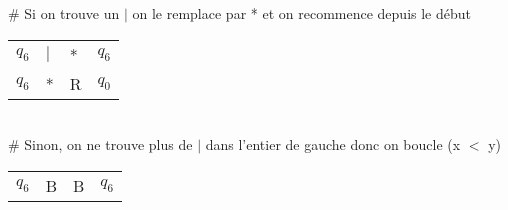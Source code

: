\documentclass{article}
\begin{document}
\# Si on trouve un $|$ on le remplace par * et on recommence depuis le début

\begin{tabular}{llll}
$q_6$ & $|$ & * & $q_6$ \\
$q_6$ & * & R & $q_0$
\end{tabular}\\

\# Sinon, on ne trouve plus de $|$ dans l'entier de gauche donc on boucle (x $<$ y)

\begin{tabular}{llll}
$q_6$ & B & B & $q_6$
\end{tabular}\\
\end{document}
